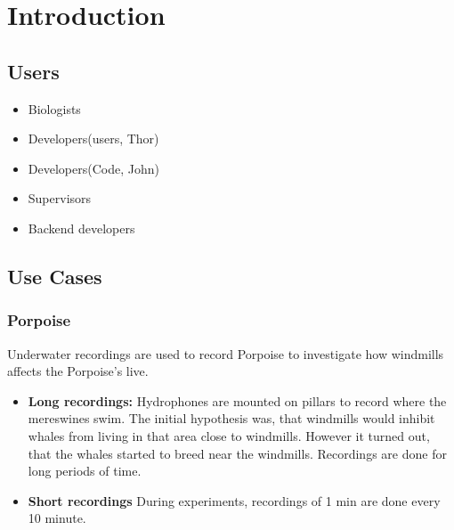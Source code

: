 \chapter{Introduction}


\section{Users}

\begin{itemize}
	\item Biologists
	\item Developers(users, Thor)
	\item Developers(Code, John)
	\item Supervisors
	\item Backend developers
\end{itemize}

\section{Use Cases}
\subsection{Porpoise}
Underwater recordings are used to record Porpoise to investigate how windmills affects the Porpoise's live.
\begin{itemize}
	\item {\textbf{Long recordings:}}  Hydrophones are mounted on pillars to record where the mereswines swim. The initial hypothesis was, that windmills would inhibit whales from living in that area close to windmills. However it turned out, that the whales started to breed near the windmills. Recordings are done for long periods of time.
	
	\item {\textbf{Short recordings}} During experiments, recordings of 1 min are done every 10 minute.

\end{itemize}

